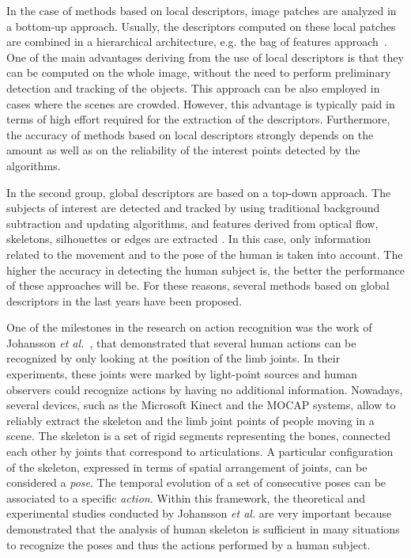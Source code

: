 \documentclass[runningheads,a4paper]{llncs}
\begin{document}

In the case of methods based on local descriptors, image patches are analyzed in a bottom-up approach. Usually, the descriptors computed on these local patches are combined in a hierarchical architecture, e.g. the bag of features approach~\cite{dollar05,Kovashka10,Lee14}.
One of the main advantages deriving from the use of local descriptors is that they can be computed on the whole image, without the need to perform preliminary detection and tracking of the objects. This approach can be also employed in cases where the scenes are crowded. However, this advantage is typically paid in terms of high effort required for the extraction of the descriptors. Furthermore, the accuracy of  methods based on local descriptors strongly depends on the amount as well as on the reliability of the interest points detected by the algorithms.

%
In the second group, global descriptors are based on a top-down approach. The subjects of interest are detected and tracked by using traditional background subtraction and updating algorithms, and features derived from optical flow, skeletons, silhouettes or edges are extracted \cite{yan11,wang07,sba13,ofli12}.
In this case, only information related to the movement and to the pose of the human is taken into account. The higher the accuracy in detecting the human subject is, the better the performance of these approaches will be.
For these reasons, several methods based on global descriptors in the last years have been proposed.

One of the milestones in the research on action recognition was the work of Johansson \emph{et al.}~\cite{Johansson73}, that demonstrated that several human actions can be recognized by only looking at the position of the limb joints. In their experiments, these joints were marked by light-point sources and human observers could recognize actions by having no additional information.
Nowadays, several devices, such as the Microsoft Kinect and the MOCAP systems, allow to reliably extract the skeleton and the limb joint points of people moving in a scene. 
The skeleton is a set of rigid segments representing the bones, connected each other by joints that correspond to articulations. A particular configuration of the skeleton, expressed in terms of spatial arrangement of joints, can be considered a \emph{pose}. The temporal evolution of a set of consecutive poses can be associated to a specific \emph{action}. 
%
Within this framework, the theoretical and experimental studies conducted by Johansson \emph{et al.} are very important because demonstrated that the analysis of human skeleton is sufficient in many situations to recognize the poses and thus the actions performed by a human subject.
\end{document}
